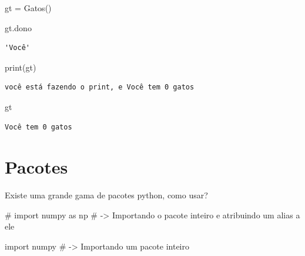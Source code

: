 \documentclass[
  letterpaper,
  DIV=11,
  numbers=noendperiod]{scrreprt}
\newenvironment{Shaded}{\begin{snugshade}}{\end{snugshade}}
\newcommand{\BuiltInTok}[1]{\textcolor[rgb]{0.00,0.23,0.31}{#1}}
\newcommand{\CommentTok}[1]{\textcolor[rgb]{0.37,0.37,0.37}{#1}}
\newcommand{\ImportTok}[1]{\textcolor[rgb]{0.00,0.46,0.62}{#1}}
\newcommand{\NormalTok}[1]{\textcolor[rgb]{0.00,0.23,0.31}{#1}}
\newcommand{\OperatorTok}[1]{\textcolor[rgb]{0.37,0.37,0.37}{#1}}
\begin{document}
\begin{Shaded}
\begin{Highlighting}[]
\NormalTok{gt }\OperatorTok{=}\NormalTok{ Gatos()}
\end{Highlighting}
\end{Shaded}

\begin{Shaded}
\begin{Highlighting}[]
\NormalTok{gt.dono}
\end{Highlighting}
\end{Shaded}

\begin{verbatim}
'Você'
\end{verbatim}

\begin{Shaded}
\begin{Highlighting}[]
\BuiltInTok{print}\NormalTok{(gt)}
\end{Highlighting}
\end{Shaded}

\begin{verbatim}
você está fazendo o print, e Você tem 0 gatos
\end{verbatim}

\begin{Shaded}
\begin{Highlighting}[]
\NormalTok{gt}
\end{Highlighting}
\end{Shaded}

\begin{verbatim}
Você tem 0 gatos
\end{verbatim}

\section{Pacotes}\label{pacotes}

Existe uma grande gama de pacotes python, como usar?

\begin{Shaded}
\begin{Highlighting}[]
\CommentTok{\# import numpy as np \# {-}\textgreater{} Importando o pacote inteiro e atribuindo um alias a ele}
\end{Highlighting}
\end{Shaded}

\begin{Shaded}
\begin{Highlighting}[]
\ImportTok{import}\NormalTok{ numpy }\CommentTok{\# {-}\textgreater{} Importando um pacote inteiro}
\end{Highlighting}
\end{Shaded}
\end{document}
